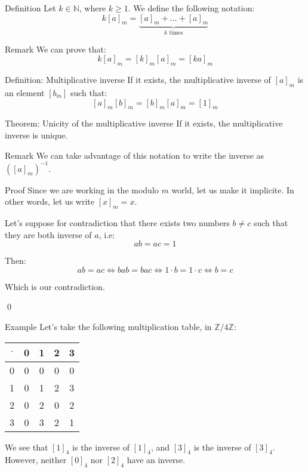 \documentclass[a4paper]{article}
\begin{document}
\begin{parag}{Definition}
    Let $k \in \mathbb{N}$, where $k \geq 1$. We define the following notation: 
    \[k\left[a\right]_m = \underbrace{\left[a\right]_m + \ldots + \left[a\right]_m}_{\text{$k$ times}}\]
    
    \begin{subparag}{Remark}
        We can prove that: 
        \[k\left[a\right]_m = \left[k\right]_m \left[a\right]_m = \left[ka\right]_m\]
    \end{subparag}
\end{parag}

\begin{parag}{Definition: Multiplicative inverse}
    If it exists, the multiplicative inverse of $\left[a\right]_m$ is an element $\left[b_m\right]$ such that:
    \[\left[a\right]_m \left[b\right]_m = \left[b\right]_m \left[a\right]_m = \left[1\right]_m\]
\end{parag}

\begin{parag}{Theorem: Unicity of the multiplicative inverse}
    If it exists, the multiplicative inverse is unique. 

    \begin{subparag}{Remark}
        We can take advantage of this notation to write the inverse as $\left(\left[a\right]_m\right)^{-1}$.
    \end{subparag}

    \begin{subparag}{Proof}
        Since we are working in the modulo $m$ world, let us make it implicite. In other words, let us write $\left[x\right]_m = x$.

        Let's suppose for contradiction that there exists two numbers $b \neq c$ such that they are both inverse of $a$, i.e:
        \[ab = ac = 1\]
        
        Then: 
        \[ab = ac \iff bab = bac \iff 1\cdot b = 1\cdot c \iff b = c\]

        Which is our contradiction.

        \qed
    \end{subparag}
\end{parag}

\begin{parag}{Example}
    Let's take the following multiplication table, in $\mathbb{Z} / 4\mathbb{Z}$:
    \begin{center}
    \begin{tabular}{c|cccc}
        $\cdot$ & 0 & 1 & 2 & 3 \\
        \hline
        0 & 0 & 0 & 0 & 0 \\
        1 & 0 & 1 & 2 & 3 \\
        2 & 0 & 2 & 0 & 2 \\
        3 & 0 & 3 & 2 & 1
    \end{tabular}
    \end{center}

    We see that $\left[1\right]_4$ is the inverse of $\left[1\right]_4$, and $\left[3\right]_4$ is the inverse of $\left[3\right]_4$. However, neither $\left[0\right]_4$ nor $\left[2\right]_4$ have an inverse.
\end{parag}
\end{document}
